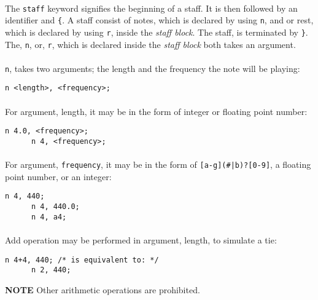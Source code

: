\documentclass{article}
\begin{document}
\paragraph{} The \verb+staff+ keyword signifies the beginning of a staff. It is then followed by an identifier and \verb+{+. A staff consist of
notes, which is declared by using \verb+n+, and or rest, which is declared by using \verb+r+, inside the \textit{staff block}. The staff, is terminated by \verb+}+. The, \verb+n+, or, \verb+r+, which is declared inside the \textit{staff block} both takes an argument.

\paragraph{} \verb+n+, takes two arguments; the length and the frequency the note will be playing:
\begin{Verbatim}[frame=single]
      n <length>, <frequency>;
\end{Verbatim}

\paragraph{} For argument, length, it may be in the form of integer or floating point number:
\begin{Verbatim}[frame=single]
      n 4.0, <frequency>;
      n 4, <frequency>;
\end{Verbatim}
\paragraph{} For argument, \verb+frequency+, it may be in the form of \verb+[a-g](#|b)?[0-9]+, a floating
point number, or an integer:

\begin{Verbatim}[frame=single]
      n 4, 440;
      n 4, 440.0;
      n 4, a4;
\end{Verbatim}

\paragraph{} Add operation may be performed in argument, length, to simulate a tie:

\begin{Verbatim}[frame=single]
      n 4+4, 440; /* is equivalent to: */
      n 2, 440; 
\end{Verbatim}
\textbf{NOTE} Other arithmetic operations are prohibited.
\end{document}
